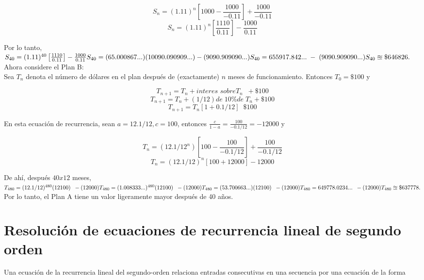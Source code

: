 \documentclass{article}
\begin{document}
$$S_{n}= (1.11)^{n} \left[1000 - \frac{1000}{-0.11}\right] + \frac{1000}{-0.11}$$
$$S_{n}=(1.11)^{n}\left[\frac{1110}{0.11}\right]- \frac{1000}{0.11}$$

Por lo tanto,\\
$S_{40} = (1.11)^{40}\left[\frac{1110}{0.11}\right]- \frac{1000}{0.11} \\
S_{40}=(65.000867...)(10090.090909...)-(9090.909090...)\\
S_{40}=655917.842...\; - \; (9090.909090...)\\
S_{40} \approxeq \$646826.$ \\


Ahora considere el Plan B:\\
Sea $T_n$ denota el número de dólares en el plan después de (exactamente) $n$ meses de funcionamiento. Entonces $T_0 = \$100$ y

$$T_{n+1} = T_{n} + \textit{interes sobre} T_{n} \;\; + \$100$$
$$T_{n+1} = T_{n} + (1/12) \textit{de}\; 10\% \textit{de}\; T_{n} + \$100$$
$$T_{n+1} = T_{n}[1+0.1/12] \;\; \$100$$

En esta ecuación de recurrencia, sean $a=12.1/12, c=100$, entonces $\frac{c}{1-a} = \frac{100}{-0.1/12} = -12000$ y

$$T_n = (12.1/12^{n})\left[100 - \frac{100}{-0.1/12}\right] + \frac{100}{-0.1/12}$$
$$T_n = (12.1/12)^{n}[100 + 12000] - 12000$$

De ahí, después $40x12$ meses,\\

$
T_{480}=(12.1/12)^{480}(12100) \;\; -(12000)\\
T_{480}=(1.008333...)^{480}(12100)\;\; -(12000)\\
T_{480}=(53.700663...)(12100)\;\; -(12000)\\
T_{480}=649778.0234... \;\; -(12000)\\
T_{480}\approxeq \$637778.
$\\
Por lo tanto, el Plan A tiene un valor ligeramente mayor después de 40 años.

\section{Resolución de ecuaciones de recurrencia lineal de segundo orden}



Una ecuación de la recurrencia lineal del segundo-orden relaciona entradas consecutivas en una secuencia por una ecuación de la forma
\end{document}
